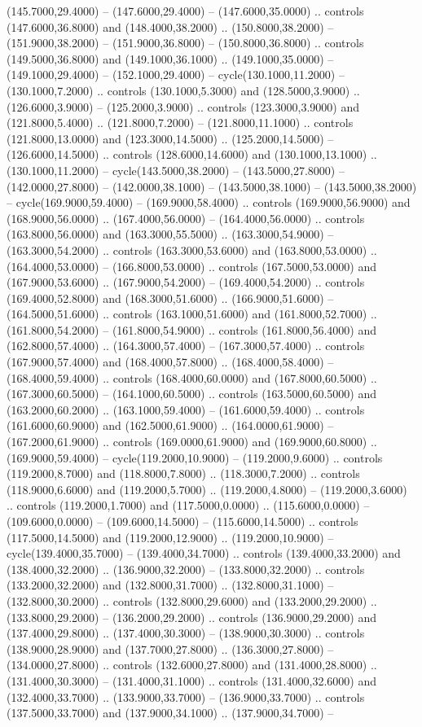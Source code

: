 (145.7000,29.4000) -- (147.6000,29.4000) -- (147.6000,35.0000) .. controls (147.6000,36.8000) and (148.4000,38.2000) .. (150.8000,38.2000) -- (151.9000,38.2000) -- (151.9000,36.8000) -- (150.8000,36.8000) .. controls (149.5000,36.8000) and (149.1000,36.1000) .. (149.1000,35.0000) -- (149.1000,29.4000) -- (152.1000,29.4000) -- cycle(130.1000,11.2000) -- (130.1000,7.2000) .. controls (130.1000,5.3000) and (128.5000,3.9000) .. (126.6000,3.9000) -- (125.2000,3.9000) .. controls (123.3000,3.9000) and (121.8000,5.4000) .. (121.8000,7.2000) -- (121.8000,11.1000) .. controls (121.8000,13.0000) and (123.3000,14.5000) .. (125.2000,14.5000) -- (126.6000,14.5000) .. controls (128.6000,14.6000) and (130.1000,13.1000) .. (130.1000,11.2000) -- cycle(143.5000,38.2000) -- (143.5000,27.8000) -- (142.0000,27.8000) -- (142.0000,38.1000) -- (143.5000,38.1000) -- (143.5000,38.2000) -- cycle(169.9000,59.4000) -- (169.9000,58.4000) .. controls (169.9000,56.9000) and (168.9000,56.0000) .. (167.4000,56.0000) -- (164.4000,56.0000) .. controls (163.8000,56.0000) and (163.3000,55.5000) .. (163.3000,54.9000) -- (163.3000,54.2000) .. controls (163.3000,53.6000) and (163.8000,53.0000) .. (164.4000,53.0000) -- (166.8000,53.0000) .. controls (167.5000,53.0000) and (167.9000,53.6000) .. (167.9000,54.2000) -- (169.4000,54.2000) .. controls (169.4000,52.8000) and (168.3000,51.6000) .. (166.9000,51.6000) -- (164.5000,51.6000) .. controls (163.1000,51.6000) and (161.8000,52.7000) .. (161.8000,54.2000) -- (161.8000,54.9000) .. controls (161.8000,56.4000) and (162.8000,57.4000) .. (164.3000,57.4000) -- (167.3000,57.4000) .. controls (167.9000,57.4000) and (168.4000,57.8000) .. (168.4000,58.4000) -- (168.4000,59.4000) .. controls (168.4000,60.0000) and (167.8000,60.5000) .. (167.3000,60.5000) -- (164.1000,60.5000) .. controls (163.5000,60.5000) and (163.2000,60.2000) .. (163.1000,59.4000) -- (161.6000,59.4000) .. controls (161.6000,60.9000) and (162.5000,61.9000) .. (164.0000,61.9000) -- (167.2000,61.9000) .. controls (169.0000,61.9000) and (169.9000,60.8000) .. (169.9000,59.4000) -- cycle(119.2000,10.9000) -- (119.2000,9.6000) .. controls (119.2000,8.7000) and (118.8000,7.8000) .. (118.3000,7.2000) .. controls (118.9000,6.6000) and (119.2000,5.7000) .. (119.2000,4.8000) -- (119.2000,3.6000) .. controls (119.2000,1.7000) and (117.5000,0.0000) .. (115.6000,0.0000) -- (109.6000,0.0000) -- (109.6000,14.5000) -- (115.6000,14.5000) .. controls (117.5000,14.5000) and (119.2000,12.9000) .. (119.2000,10.9000) -- cycle(139.4000,35.7000) -- (139.4000,34.7000) .. controls (139.4000,33.2000) and (138.4000,32.2000) .. (136.9000,32.2000) -- (133.8000,32.2000) .. controls (133.2000,32.2000) and (132.8000,31.7000) .. (132.8000,31.1000) -- (132.8000,30.2000) .. controls (132.8000,29.6000) and (133.2000,29.2000) .. (133.8000,29.2000) -- (136.2000,29.2000) .. controls (136.9000,29.2000) and (137.4000,29.8000) .. (137.4000,30.3000) -- (138.9000,30.3000) .. controls (138.9000,28.9000) and (137.7000,27.8000) .. (136.3000,27.8000) -- (134.0000,27.8000) .. controls (132.6000,27.8000) and (131.4000,28.8000) .. (131.4000,30.3000) -- (131.4000,31.1000) .. controls (131.4000,32.6000) and (132.4000,33.7000) .. (133.9000,33.7000) -- (136.9000,33.7000) .. controls (137.5000,33.7000) and (137.9000,34.1000) .. (137.9000,34.7000) -- 